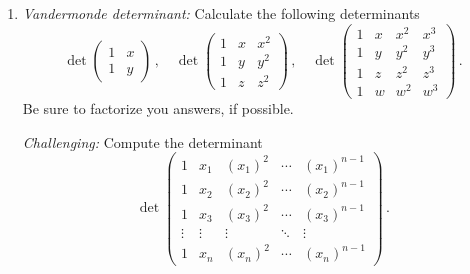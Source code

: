 \begin{enumerate}
\item
{\it Vandermonde determinant:} Calculate the following determinants
$$
\det \begin{pmatrix}1 & x\\ 1 & y\end{pmatrix}\, ,\quad
\det \begin{pmatrix}1 & x & x^2\\ 1 & y&y^2\\ 1& z&z^2\end{pmatrix}\, ,\quad
\det \begin{pmatrix}1 & x & x^2 & x^3\\ 1 & y& y^2 & y^3\\ 1 & z & z^2 & z^3\\ 1 & w & w^2 & w^3\end{pmatrix}\, .
$$
Be sure to factorize you answers, if possible.

{\it Challenging:} Compute the determinant
$$
\det \begin{pmatrix}1 & x_1 & (x_1)^2 & \cdots &(x_1)^{n-1}\\ 
1 & x_2& (x_2)^2 & \cdots &  (x_2)^{n-1}\\ 
1 & x_3& (x_3)^2 & \cdots &  (x_3)^{n-1}\\ 
\vdots &\vdots &\vdots &\ddots & \vdots\ \ \  \\ 
1 & x_n& (x_n)^2 & \cdots &  (x_n)^{n-1}\end{pmatrix}\, .
$$


\end{enumerate}
